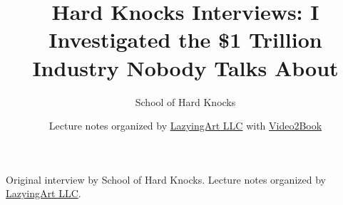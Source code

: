 \documentclass[11pt,oneside]{book}
\begin{document}
\frontmatter
\title{Hard Knocks Interviews: I Investigated the \$1 Trillion Industry Nobody Talks About}
\author{School of Hard Knocks}
\date{Lecture notes organized by \href{https://lazying.art}{LazyingArt LLC} with \href{https://github.com/lachlanchen/Video2Book}{Video2Book}}
\maketitle
\begin{center}
\small Original interview by School of Hard Knocks. Lecture notes organized by \href{https://lazying.art}{LazyingArt LLC}.
\end{center}
\clearpage
\mainmatter

\end{document}
